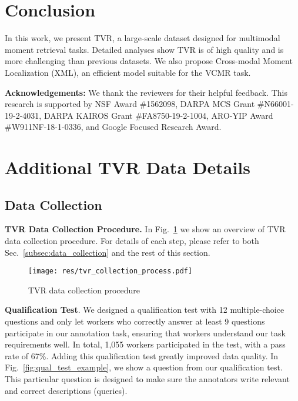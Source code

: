 \documentclass[runningheads]{llncs}
\begin{document}
 \section{Conclusion}\label{conclusion}
In this work, we present TVR, a large-scale dataset designed for multimodal moment retrieval tasks. Detailed analyses show TVR is of high quality and is more challenging than previous datasets. We also propose Cross-modal Moment Localization (XML), an efficient model suitable for the VCMR task.

\smallskip
\noindent
{\bf Acknowledgements:} We thank the reviewers for their helpful feedback. This research is supported by NSF Award \#1562098, DARPA MCS Grant \#N66001-19-2-4031, DARPA KAIROS Grant \#FA8750-19-2-1004, ARO-YIP Award \#W911NF-18-1-0336, and Google Focused Research Award.
 
\appendix
\section{Additional TVR Data Details}



\subsection{Data Collection}\label{subsec:appendix_data_collection}

\noindent\textbf{TVR Data Collection Procedure.}
In Fig.~\ref{fig:tvr_collection_overview} we show an overview of TVR data collection procedure.
For details of each step, please refer to both Sec.~\ref{subsec:data_collection} and the rest of this section.

\begin{figure}[!ht]
  \centering
  \texttt{[image: res/tvr\_collection\_process.pdf]}
  \caption{TVR data collection procedure}
  \label{fig:tvr_collection_overview}
\end{figure}

\kern2mm
\noindent\textbf{Qualification Test}.
We designed a qualification test with 12 multiple-choice questions and only let workers who correctly answer at least 9 questions participate in our annotation task, ensuring that workers understand our task requirements well.
In total, 1,055 workers participated in the test, with a pass rate of 67\%. 
Adding this qualification test greatly improved data quality. In Fig.~\ref{fig:qual_test_example}, we show a question from our qualification test. 
This particular question is designed to make sure the annotators write relevant and correct descriptions (queries). 
\end{document}
